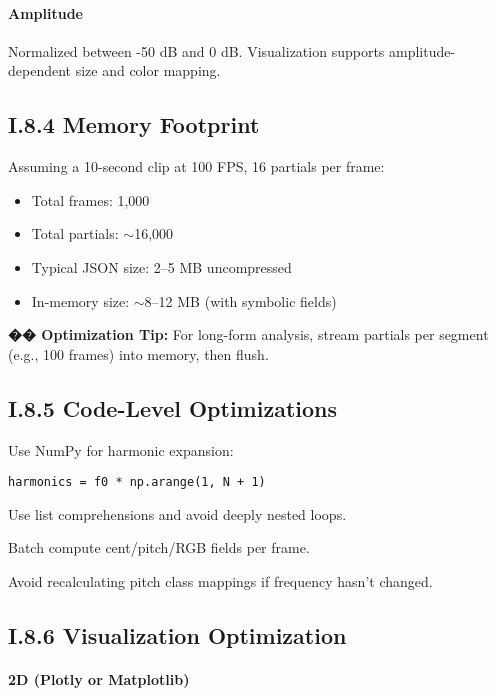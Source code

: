\paragraph{Amplitude} Normalized between -50 dB and 0 dB. Visualization supports amplitude-dependent size and color mapping.

\subsection*{I.8.4 Memory Footprint}

Assuming a 10-second clip at 100 FPS, 16 partials per frame:

\begin{itemize}
    \item Total frames: 1,000
    \item Total partials: $\sim$16,000
    \item Typical JSON size: 2–5 MB uncompressed
    \item In-memory size: $\sim$8–12 MB (with symbolic fields)
\end{itemize}

\textbf{�� Optimization Tip:} For long-form analysis, stream partials per segment (e.g., 100 frames) into memory, then flush.

\subsection*{I.8.5 Code-Level Optimizations}

Use NumPy for harmonic expansion:

\begin{verbatim}
harmonics = f0 * np.arange(1, N + 1)
\end{verbatim}

Use list comprehensions and avoid deeply nested loops.

Batch compute cent/pitch/RGB fields per frame.

Avoid recalculating pitch class mappings if frequency hasn’t changed.

\subsection*{I.8.6 Visualization Optimization}

\paragraph{2D (Plotly or Matplotlib)}

